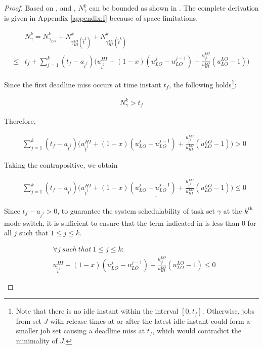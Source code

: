 \documentclass[10pt,journal,compsoc]{IEEEtran}
\begin{document}
\begin{proof}
Based on ,  and , $N^{k}_{\gamma}$ can be bounded as shown in . The complete derivation is given in Appendix \ref{appendix:I} because of space limitations. 
\begingroup
\allowdisplaybreaks
\begin{scriptsize}
\begin{align}
&N^{k}_{\gamma}=N^{k}_{\gamma_{LO}}+N^{k}_{\gamma_{HI}^{HI}(\hat{t}^{k})}+N^{k}_{\gamma_{HI}^{LO}(\hat{t}^{k})} \nonumber \\
\le&t_f+\sum_{j=1}^{k}(t_f-a_{\hat{t}^j})\bigg(u_{\hat{t}^j}^{HI}+(1-x)(u_{LO}^{j}-u_{LO}^{j-1})+\frac{u_{\hat{t}^j}^{LO}}{u_{HI}^{LO}}(u_{LO}^{LO}-1)\bigg) 
\label{eq:main:0}
\end{align}
\end{scriptsize}
\endgroup
Since the first deadline miss occurs at time instant $t_f$, the following holds\footnote{Note that there is no idle instant within the interval $[0,t_f]$. 
Otherwise, jobs from set $J$ with release times at or after the latest idle instant could form a smaller job set causing a deadline miss at $t_f$, which would contradict the minimality of $J$.}:
\begin{small}
\begin{align*}
N^{k}_{\gamma}>{t_f}
\end{align*}
\end{small}

Therefore, 
\begin{footnotesize}
\begin{align*}
&\sum_{j=1}^{k}(t_f-a_{\hat{t}^j})\bigg(u_{\hat{t}^j}^{HI}+(1-x)(u_{LO}^{j}-u_{LO}^{j-1})+\frac{u_{\hat{t}^j}^{LO}}{u_{HI}^{LO}}(u_{LO}^{LO}-1)\bigg)>{0}
\end{align*}
\end{footnotesize}

Taking the contrapositive, we obtain
\begin{footnotesize}
\begin{align}
&\sum_{j=1}^{k}(t_f-a_{\hat{t}^j})\underline{\bigg(u_{\hat{t}^j}^{HI}+(1-x)(u_{LO}^{j}-u_{LO}^{j-1})+\frac{u_{\hat{t}^j}^{LO}}{u_{HI}^{LO}}(u_{LO}^{LO}-1)\bigg)}\le{0}
\label{eq:4}
\end{align}
\end{footnotesize}

Since $t_f-a_{\hat{t}^j}>0$, to guarantee the system schedulability of task set $\gamma$ at the $k^{\textit{th}}$ mode switch, it is sufficient to ensure that the term indicated in  is less than 0 for all $j$ such that $1\le{j}\le{k}$.
\begin{footnotesize}
\begin{align}
&\forall j\ such\ that\ 1\le{j}\le{k}: \nonumber \\
&u_{\hat{t}^j}^{HI}+(1-x)(u_{LO}^{j}-u_{LO}^{j-1})+\frac{u_{\hat{t}^j}^{LO}}{u_{HI}^{LO}}(u_{LO}^{LO}-1)\le{0}
\label{eq:5}
\end{align}
\end{footnotesize}    
\end{proof}
\end{document}
